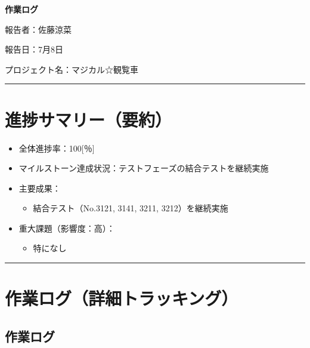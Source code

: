 \documentclass[uplatex,dvipdfmx,a4paper,11pt]{jsarticle}
\newcommand{\sectionrule}{\par\medskip\noindent\rule{\linewidth}{0.6pt}\par\medskip}
\begin{document}
{\LARGE\bfseries 作業ログ}\par\bigskip

報告者：佐藤涼菜

報告日：7月8日

プロジェクト名：マジカル☆観覧車

\sectionrule


\section{進捗サマリー（要約）}

\begin{itemize}
  \item 全体進捗率：100[％]
  \item マイルストーン達成状況：テストフェーズの結合テストを継続実施
  \item 主要成果：
    \begin{itemize}
      \item {結合テスト（No.3121, 3141, 3211, 3212）を継続実施}
    \end{itemize}
  \item 重大課題（影響度：高）：
    \begin{itemize}
      \item {特になし}
    \end{itemize}
\end{itemize}

\sectionrule


\section{作業ログ（詳細トラッキング）}

\subsection{作業ログ}

\renewcommand{\arraystretch}{1.2}

\small
\end{document}
